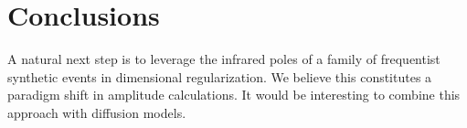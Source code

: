 \section{Conclusions}\label{sec:conclusions}

A natural next step is to leverage the infrared poles of a family of
frequentist synthetic events in dimensional regularization. We believe
this constitutes a paradigm shift in amplitude calculations. It would be
interesting to combine this approach with diffusion models.

